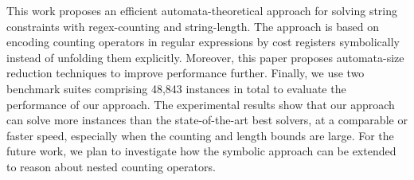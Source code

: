 
This work proposes an efficient automata-theoretical approach for solving string constraints with regex-counting and string-length. The approach is based on encoding counting operators in regular expressions by cost registers symbolically instead of unfolding them explicitly. Moreover, this paper proposes automata-size reduction techniques to improve performance further. Finally, we use two benchmark suites comprising 48,843 instances in total to evaluate the performance of our approach. The experimental results show that our approach can solve more instances than the state-of-the-art best solvers, at a comparable or faster speed, especially when the counting and length bounds are large. 
For the future work, we plan to investigate how the symbolic approach can be extended to reason about nested counting operators. 
